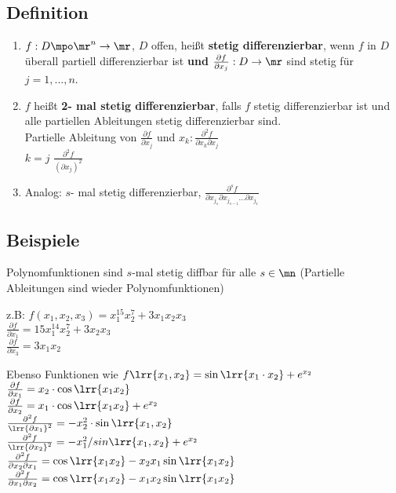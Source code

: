 \subsection{Definition}
	\begin{enumerate}
		\item $ f: D\mpo\mr^n\rightarrow\mr $, $ D $ offen, heißt \textbf{stetig differenzierbar}, wenn $ f $ in $ D $ überall partiell differenzierbar ist \textbf{und} $ \frac{\partial f}{\partial x_j}:D\rightarrow\mr $ sind stetig für $ j=1,...,n $.
		
		\item  $ f $ heißt \textbf{2- mal stetig differenzierbar}, falls $ f $ stetig differenzierbar ist und alle partiellen Ableitungen stetig differenzierbar sind.\\
		Partielle Ableitung von $ \frac{\partial f}{\partial x_j} $ und $ x_k:\frac{\partial^2 f}{\partial x_k\partial x_j} $\\
		$ k=j $ $ \frac{\partial^2 f}{(\partial x_j)^2} $
		
		\item Analog: $ s $- mal stetig differenzierbar, $ \frac{\partial^s f}{\partial x_{j_{s}}\partial x_{j_{s-1}}...\partial x_{j_{1}}} $
	\end{enumerate}
	
\subsection{Beispiele}
		\item Polynomfunktionen sind $s$-mal stetig diffbar für alle $s\in\mn$ (Partielle Ableitungen sind wieder Polynomfunktionen)
			
			z.B: $f(x_1,x_2,x_3)=x_1^{15}x_2^7+3x_1x_2x_3$\\
			$\frac{\partial f}{\partial x_1} = 15x_1^{14}x_2^7+3x_2x_3$\\
			$\frac{\partial f}{\partial x_3} = 3x_1x_2$
		\item Ebenso Funktionen wie $f\lrr{x_1,x_2} = \sin\lrr{x_1\cdot x_2}+e^{x_2}$\\
			$\frac{\partial f}{\partial x_1} = x_2\cdot\cos\lrr{x_1x_2}$\\
			$\frac{\partial f}{\partial x_2} = x_1\cdot\cos\lrr{x_1x_2}+e^{x_2}$\\
			$\frac{\partial^2f}{\lrr{\partial x_1}^2} = -x_2^2\cdot\sin\lrr{x_1,x_2}$\\
			$\frac{\partial^2f}{\lrr{\partial x_2}^2} = -x_1^2/sin\lrr{x_1,x_2}+e^{x_2}$\\
			$\frac{\partial^2f}{\partial x_2\partial x_1} = \cos\lrr{x_1x_2}-x_2x_1\sin\lrr{x_1x_2}$\\
			$\frac{\partial^2f}{\partial x_1\partial x_2} = \cos\lrr{x_1x_2}-x_1x_2\sin\lrr{x_1x_2}$
	\subExEnd

